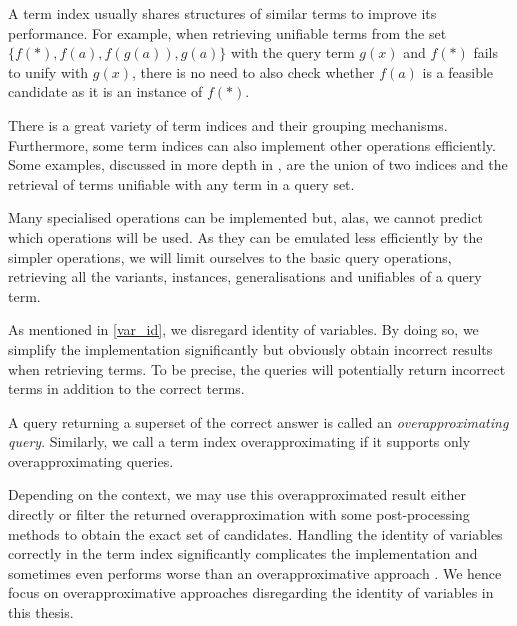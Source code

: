 
A term index usually shares structures of similar terms to improve its performance. For example, when retrieving unifiable terms from the set $\{f(*), f(a), f(g(a)), g(a)\}$ with the query term $g(x)$ and $f(*)$ fails to unify with $g(x)$, there is no need to also check whether $f(a)$ is a feasible candidate as it is an instance of $f(*)$.

There is a great variety of term indices and their grouping mechanisms. Furthermore, some term indices can also implement other operations efficiently. Some examples, discussed in more depth in \cite{carbonell_comparison_1995}, are the union of two indices and the retrieval of terms unifiable with any term in a query set.

Many specialised operations can be implemented but, alas, we cannot predict which operations will be used. As they can be emulated less efficiently by the simpler operations, we will limit ourselves to the basic query operations, retrieving all the variants, instances, generalisations and unifiables of a query term.

As mentioned in \cref{var_id}, we disregard identity of variables. By doing so, we simplify the implementation significantly but obviously obtain incorrect results when retrieving terms. To be precise, the queries will potentially return incorrect terms in addition to the correct terms.

\begin{defn}
  A query returning a superset of the correct answer is called an \emph{overapproximating query}. Similarly, we call a term index overapproximating if it supports only overapproximating queries.
\end{defn}

Depending on the context, we may use this overapproximated result either directly or filter the returned overapproximation with some post-processing methods to obtain the exact set of candidates. Handling the identity of variables correctly in the term index significantly complicates the implementation and sometimes even performs worse than an overapproximative approach \cite{carbonell_comparison_1995}. We hence focus on overapproximative approaches disregarding the identity of variables in this thesis.
